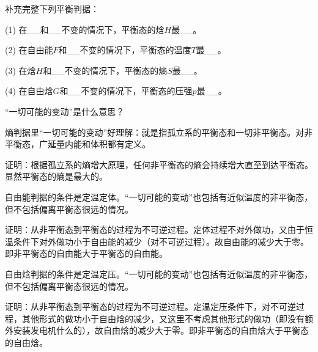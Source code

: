 \documentclass[CJK]{beamer}
\begin{document}
\begin{frame}
  \bch
  补充完整下列平衡判据：
  \bitem
\item[(1)]{在\_\_和\_\_不变的情况下，平衡态的焓$H$最\_\_。}
\item[(2)]{在自由能$F$和\_\_不变的情况下，平衡态的温度$T$最\_\_。}
\item[(3)]{在焓$H$和\_\_不变的情况下，平衡态的熵$S$最\_\_。}
\item[(4)]{在自由焓$G$和\_\_不变的情况下，平衡态的压强$p$最\_\_。}
  \eitem
  \ech
\end{frame}

\begin{frame}
\bch
“一切可能的变动”是什么意思？

\ech
\end{frame}

\begin{frame}
\bch
熵判据里“一切可能的变动”好理解：就是指孤立系的平衡态和一切非平衡态。对非平衡态，广延量内能和体积都有定义。



证明：根据孤立系的熵增大原理，任何非平衡态的熵会持续增大直至到达平衡态。显然平衡态的熵是最大的。

\ech
\end{frame}


\begin{frame}
\bch
自由能判据的条件是定温定体。“一切可能的变动”也包括有近似温度的非平衡态，但不包括偏离平衡态很远的情况。


证明：从非平衡态到平衡态的过程为不可逆过程。定体过程不对外做功，又由于恒温条件下对外做功小于自由能的减少（对不可逆过程）。故自由能的减少大于零。即非平衡态的自由能大于平衡态的自由能。

\ech
\end{frame}

\begin{frame}
\bch
自由焓判据的条件是定温定压。“一切可能的变动”也包括有近似温度的非平衡态，但不包括偏离平衡态很远的情况。


证明：从非平衡态到平衡态的过程为不可逆过程。定温定压条件下，对不可逆过程，其他形式的做功小于自由焓的减少，又这里不考虑其他形式的做功（即没有额外安装发电机什么的），故自由焓的减少大于零。即非平衡态的自由焓大于平衡态的自由焓。

\ech
\end{frame}
\end{document}
